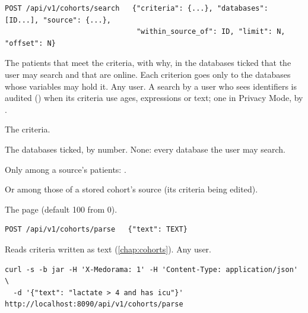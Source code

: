 \begin{lstlisting}[style=signature]
POST /api/v1/cohorts/search   {"criteria": {...}, "databases": [ID...], "source": {...},
                               "within_source_of": ID, "limit": N, "offset": N}
\end{lstlisting}
The patients that meet the criteria, with why, in the databases ticked that the user may search
and that are online. Each criterion goes only to the databases whose variables may hold it. Any
user. A search by a user who sees identifiers is audited () when its criteria
use ages, expressions or text; one in Privacy Mode, by .
\begin{params}
\item[criteria] The criteria.
\item[databases] The databases ticked, by number. None: every database the user may search.
\item[source] Only among a source's patients: .
\item[within\_source\_of] Or among those of a stored cohort's source (its criteria being
  edited).
\item[limit, offset] The page (default 100 from 0).
\end{params}

\begin{lstlisting}[style=signature]
POST /api/v1/cohorts/parse   {"text": TEXT}
\end{lstlisting}
Reads criteria written as text (\cref{chap:cohorts}). Any user.
\begin{lstlisting}[style=shell]
curl -s -b jar -H 'X-Medorama: 1' -H 'Content-Type: application/json' \
  -d '{"text": "lactate > 4 and has icu"}' http://localhost:8090/api/v1/cohorts/parse
\end{lstlisting}

